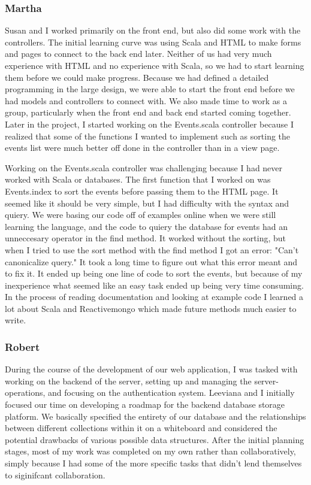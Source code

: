 \documentclass{article}
\begin{document}
\subsubsection{Martha}
    Susan and I worked primarily on the front end, but also did some work with the controllers.  The initial learning curve was using Scala and HTML to make forms and pages to connect to the back end later.  Neither of us had very much experience with HTML and no experience with Scala, so we had to start learning them before we could make progress.  Because we had defined a detailed programming in the large design, we were able to start the front end before we had models and controllers to connect with.  We also made time to work as a group, particularly when the front end and back end started coming together.  Later in the project, I started working on the Events.scala controller because I realized that some of the functions I wanted to implement such as sorting the events list were much better off done in the controller than in a view page.
    
    Working on the Events.scala controller was challenging because I had never worked with Scala or databases.  The first function that I worked on was Events.index to sort the events before passing them to the HTML page.  It seemed like it should be very simple, but I had difficulty with the syntax and quiery.  We were basing our code off of examples online when we were still learning the language, and the code to quiery the database for events had an unneccesary operator in the find method. It worked without the sorting, but when I tried to use the sort method with the find method I got an error: "Can't canonicalize query."  It took a long time to figure out what this error meant and to fix it.  It ended up being one line of code to sort the events, but because of my inexperience what seemed like an easy task ended up being very time consuming.  In the process of reading documentation and looking at example code I learned a lot about Scala and Reactivemongo which made future methods much easier to write.
    
\subsubsection{Robert}

    During the course of the development of our web application, I was tasked with working on the backend of the server, setting up and managing the server-operations, and focusing on the authentication system. Leeviana and I initially focused our time on developing a roadmap for the backend database storage platform. We basically specified the entirety of our database and the relationships between different collections within it on a whiteboard and considered the potential drawbacks of various possible data structures. After the initial planning stages, most of my work was completed on my own rather than collaboratively, simply because I had some of the more specific tasks that didn't lend themselves to siginifcant collaboration.
\end{document}
